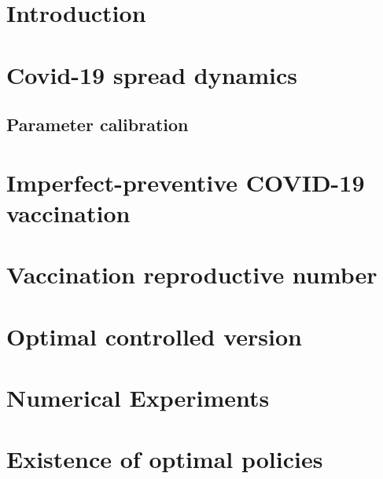 \documentclass[sort&compress]{elsarticle}
\begin{document}
    \section{Introduction}
        
    \section{Covid-19 spread dynamics}
        
        \subsection{Parameter calibration}
            
    \section{Imperfect-preventive COVID-19 vaccination}
        
    \section{Vaccination reproductive number}
        
    \section{Optimal controlled version}
        
    \section{Numerical Experiments}
        
        

    \listofchanges[style=compactsummary]
    \appendix
  \section{Existence of optimal policies}
    
  
  
\end{document}
